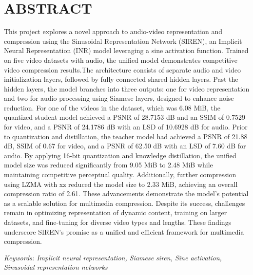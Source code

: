 \section*{ABSTRACT}
    This project explores a novel approach to audio-video representation and compression using the Sinusoidal Representation Network (SIREN), an Implicit Neural Representation (INR) model leveraging a sine activation function. Trained on five video datasets with audio, the unified model demonstrates competitive video compression results.The architecture consists of separate audio and video initialization layers, followed by fully connected shared hidden layers. Past the hidden layers, the model branches into three outputs: one for video representation and two for audio processing using Siamese layers, designed to enhance noise reduction. For one of the videos in the dataset, which was 6.08 MiB, the quantized student model achieved a PSNR of 28.7153 dB and an SSIM of 0.7529 for video, and a PSNR of 24.1786 dB with an LSD of 10.6928 dB for audio. Prior to quantization and distillation, the teacher model had achieved a PSNR of 21.88 dB, SSIM of 0.67 for video, and a PSNR of 62.50 dB with an LSD of 7.60 dB for audio. By applying 16-bit quantization and knowledge distillation, the unified model size was reduced significantly from 9.05 MiB to 2.48 MiB while maintaining competitive perceptual quality. Additionally, further compression using LZMA with xz reduced the model size to 2.33 MiB, achieving an overall compression ratio of 2.61. These advancements demonstrate the model's potential as a scalable solution for multimedia compression. Despite its success, challenges remain in optimizing representation of dynamic content, training on larger datasets, and fine-tuning for diverse video types and lengths. These findings underscore SIREN's promise as a unified and efficient framework for multimedia compression.

    \textit{Keywords: Implicit neural representation, Siamese siren, Sine activation, Sinusoidal representation networks}

